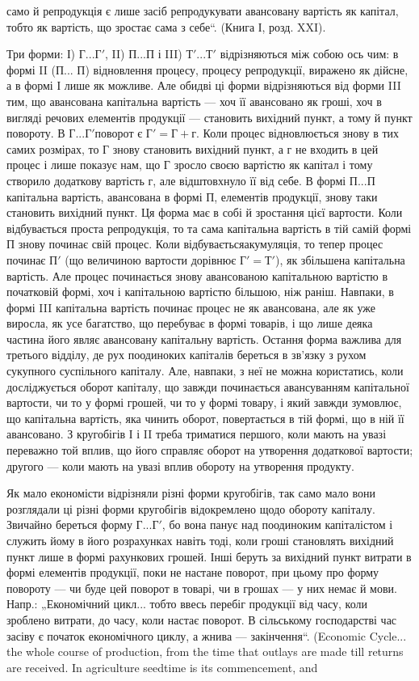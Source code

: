 \parcont{}  %
само й репродукція є лише засіб репродукувати авансовану вартість
як капітал, тобто як вартість, що зростає сама з себе“. (Книга І,
розд. XXI).

Три форми: І) $Г... Г'$, II) $П... П$ і III) $Т'... Т'$ відрізняються між
собою ось чим: в формі II (П... П) відновлення процесу, процесу репродукції,
виражено як дійсне, а в формі І лише як можливе. Але обидві ці
форми відрізняються від форми III тим, що авансована капітальна вартість
— хоч її авансовано як гроші, хоч в вигляді речових елементів продукції
— становить вихідний пункт, а тому й пункт повороту. В $Г... Г' п$оворот
є $Г' = Г + г$. Коли процес відновлюється знову в тих самих розмірах,
то Г знову становить вихідний пункт, а г не входить в цей процес і лише
показує нам, що Г зросло своєю вартістю як капітал і тому створило додаткову
вартість г, але відштовхнуло її від себе. В формі $П... П$ капітальна
вартість, авансована в формі П, елементів продукції, знову таки
становить вихідний пункт. Ця форма має в собі й зростання цієї вартости.
Коли відбувається проста репродукція, то та сама капітальна вартість
в тій самій формі П знову починає свій процес. Коли відбуваєтьсяакумуляція,
то тепер процес починає $П'$ (що величиною вартости дорівнює
$Г' = Т'$), як збільшена капітальна вартість. Але процес починається знову
авансованою капітальною вартістю в початковій формі, хоч і капітальною
вартістю більшою, ніж раніш. Навпаки, в формі III капітальна вартість
починає процес не як авансована, але як уже виросла, як усе багатство,
що перебуває в формі товарів, і що лише деяка частина його являє
авансовану капітальну вартість. Остання форма важлива для третього
відділу, де рух поодиноких капіталів береться в зв’язку з рухом сукупного
суспільного капіталу. Але, навпаки, з неї не можна користатись,
коли досліджується оборот капіталу, що завжди починається авансуванням
капітальної вартости, чи то у формі грошей, чи то у формі товару, і
який завжди зумовлює, що капітальна вартість, яка чинить оборот, повертається
в тій формі, що в ній її авансовано. З кругобігів І і II
треба триматися першого, коли мають на увазі переважно той вплив, що
його справляє оборот на утворення додаткової вартости; другого — коли
мають на увазі вплив обороту на утворення продукту.

Як мало економісти відрізняли різні форми кругобігів, так само мало
вони розглядали ці різні форми кругобігів відокремлено щодо обороту
капіталу. Звичайно береться форму $Г... Г'$, бо вона панує над поодиноким
капіталістом і служить йому в його розрахунках навіть тоді, коли
гроші становлять вихідний пункт лише в формі рахункових грошей. Інші
беруть за вихідний пункт витрати в формі елементів продукції, поки
не настане поворот, при цьому про форму повороту — чи буде цей поворот
в товарі, чи в грошах — у них немає й мови. Напр.: „Економічний
цикл... тобто ввесь перебіг продукції від часу, коли зроблено витрати,
до часу, коли настає поворот. В сільському господарстві час засіву є
початок економічного циклу, а жнива — закінчення“. (Economic Cycle...
the whole course of production, from the time that outlays are made till
returns are received. In agriculture seedtime is its commencement, and
\parbreak{}  %
